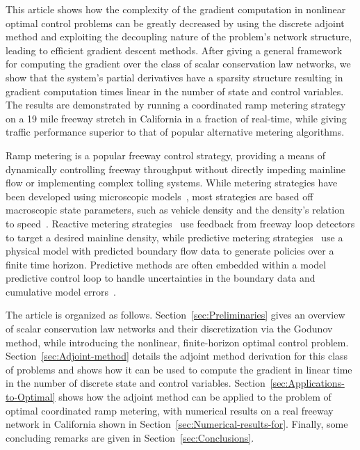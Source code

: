 This article shows how the complexity of the gradient computation in nonlinear optimal control problems can be greatly decreased by using the discrete adjoint method and exploiting the decoupling nature of the problem's network structure, leading to efficient gradient descent methods. After giving a general framework for computing the gradient over the class of scalar conservation law networks, we show that the system's partial derivatives have a sparsity structure resulting in gradient computation times linear in the number of state and control variables. The results are demonstrated by running a coordinated ramp metering strategy on a 19 mile freeway stretch in California in a fraction of real-time, while giving traffic performance superior to that of popular alternative metering algorithms.

Ramp metering is a popular freeway control strategy, providing a means of dynamically controlling freeway throughput without directly impeding mainline flow or implementing complex tolling systems. While metering strategies have been developed using microscopic models~\cite{Ben-Akiva2003}, most strategies are based off macroscopic state parameters, such as vehicle density and the density's relation to speed~\cite{richards1956shock,lighthill1955kinematic,daganzo1995cell}. Reactive metering strategies~\cite{Papageorgiou1991,Papamichail,Kachroo2003} use feedback from freeway loop detectors to target a desired mainline density, while predictive metering strategies~\cite{Frejo2011,Kotsialos2004,gomes2006optimal,Chen1997} use a physical model with predicted boundary flow data to generate policies over a finite time horizon. Predictive methods are often embedded within a model predictive control loop to handle uncertainties in the boundary data and cumulative model errors~\cite{Muralidharana}.

The article is organized as follows. Section~\ref{sec:Preliminaries} gives an overview of scalar conservation law networks and their discretization via the Godunov method, while introducing the nonlinear, finite-horizon optimal control problem. Section~\ref{sec:Adjoint-method} details the adjoint method derivation for this class of problems and shows how it can be used to compute the gradient in linear time in the number of discrete state and control variables.  Section~\ref{sec:Applications-to-Optimal} shows how the adjoint method can be applied to the problem of optimal coordinated ramp metering, with numerical results on a real freeway network in California shown in Section~\ref{sec:Numerical-results-for}. Finally, some concluding remarks are given in Section~\ref{sec:Conclusions}.